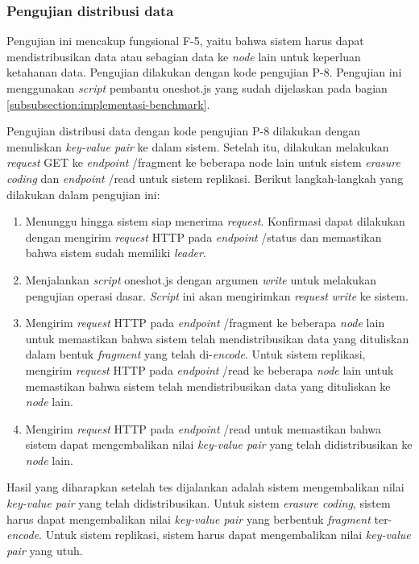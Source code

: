 \subsubsection{Pengujian distribusi data}
\label{subsubsection:pengujian-distribusi-data}

Pengujian ini mencakup fungsional F-5, yaitu bahwa sistem harus dapat mendistribusikan data atau sebagian data ke \textit{node} lain untuk keperluan ketahanan data. Pengujian dilakukan dengan kode pengujian P-8. Pengujian ini menggunakan \textit{script} pembantu oneshot.js yang sudah dijelaskan pada bagian \ref{subsubsection:implementasi-benchmark}. 

Pengujian distribusi data dengan kode pengujian P-8 dilakukan dengan menuliskan \textit{key-value pair} ke dalam sistem. Setelah itu, dilakukan melakukan \textit{request} GET ke \textit{endpoint} /fragment ke beberapa node lain untuk sistem \textit{erasure coding} dan \textit{endpoint} /read untuk sistem replikasi. Berikut langkah-langkah yang dilakukan dalam pengujian ini:

\begin{enumerate}
    \item Menunggu hingga sistem siap menerima \textit{request}. Konfirmasi dapat dilakukan dengan mengirim \textit{request} HTTP pada \textit{endpoint} /status dan memastikan bahwa sistem sudah memiliki \textit{leader}.
    \item Menjalankan \textit{script} oneshot.js dengan argumen \textit{write} untuk melakukan pengujian operasi dasar. \textit{Script} ini akan mengirimkan \textit{request} \textit{write} ke sistem.
    \item Mengirim \textit{request} HTTP pada \textit{endpoint} /fragment ke beberapa \textit{node} lain untuk memastikan bahwa sistem telah mendistribusikan data yang dituliskan dalam bentuk \textit{fragment} yang telah di-\textit{encode}. Untuk sistem replikasi, mengirim \textit{request} HTTP pada \textit{endpoint} /read ke beberapa \textit{node} lain untuk memastikan bahwa sistem telah mendistribusikan data yang dituliskan ke \textit{node} lain.
    \item Mengirim \textit{request} HTTP pada \textit{endpoint} /read untuk memastikan bahwa sistem dapat mengembalikan nilai \textit{key-value pair} yang telah didistribusikan ke \textit{node} lain.
\end{enumerate}

Hasil yang diharapkan setelah tes dijalankan adalah sistem mengembalikan nilai \textit{key-value pair} yang telah didistribusikan. Untuk sistem \textit{erasure coding}, sistem harus dapat mengembalikan nilai \textit{key-value pair} yang berbentuk \textit{fragment} ter-\textit{encode}. Untuk sistem replikasi, sistem harus dapat mengembalikan nilai \textit{key-value pair} yang utuh.